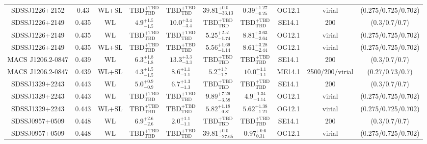 \begin{table}
\begin{tabular}{cccccccccc}
SDSSJ1226+2152 & 0.43 & WL+SL & ${\mathrm{TBD}}^{+\mathrm{TBD}}_{\mathrm{TBD}}$ & ${\mathrm{TBD}}^{+\mathrm{TBD}}_{\mathrm{TBD}}$ & ${39.81}^{+0.0}_{-33.13}$ & ${0.39}^{+1.27}_{-0.25}$ & OG12.1 & virial & (0.275/0.725/0.702) \\
SDSSJ1226+2149 & 0.435 & WL & ${4.9}^{+1.5}_{-1.5}$ & ${10.0}^{+3.4}_{-3.4}$ & ${\mathrm{TBD}}^{+\mathrm{TBD}}_{\mathrm{TBD}}$ & ${\mathrm{TBD}}^{+\mathrm{TBD}}_{\mathrm{TBD}}$ & SE14.1 & 200 & (0.3/0.7/0.7) \\
SDSSJ1226+2149 & 0.435 & WL & ${\mathrm{TBD}}^{+\mathrm{TBD}}_{\mathrm{TBD}}$ & ${\mathrm{TBD}}^{+\mathrm{TBD}}_{\mathrm{TBD}}$ & ${5.25}^{+2.51}_{-1.74}$ & ${8.81}^{+3.63}_{-2.64}$ & OG12.1 & virial & (0.275/0.725/0.702) \\
SDSSJ1226+2149 & 0.435 & WL+SL & ${\mathrm{TBD}}^{+\mathrm{TBD}}_{\mathrm{TBD}}$ & ${\mathrm{TBD}}^{+\mathrm{TBD}}_{\mathrm{TBD}}$ & ${5.56}^{+1.69}_{-1.14}$ & ${8.61}^{+3.28}_{-2.44}$ & OG12.1 & virial & (0.275/0.725/0.702) \\
MACS J1206.2-0847 & 0.439 & WL & ${6.3}^{+1.8}_{-1.8}$ & ${13.3}^{+3.3}_{-3.3}$ & ${\mathrm{TBD}}^{+\mathrm{TBD}}_{\mathrm{TBD}}$ & ${\mathrm{TBD}}^{+\mathrm{TBD}}_{\mathrm{TBD}}$ & SE14.1 & 200 & (0.3/0.7/0.7) \\
MACS J1206.2-0847 & 0.439 & WL+SL & ${4.3}^{+1.5}_{-1.5}$ & ${8.6}^{+1.1}_{-1.1}$ & ${5.2}^{+1.7}_{-1.7}$ & ${10.0}^{+1.1}_{-1.1}$ & ME14.1 & 2500/200/virial & (0.27/0.73/0.7) \\
SDSSJ1329+2243 & 0.443 & WL & ${5.0}^{+0.9}_{-0.9}$ & ${6.7}^{+1.3}_{-1.3}$ & ${\mathrm{TBD}}^{+\mathrm{TBD}}_{\mathrm{TBD}}$ & ${\mathrm{TBD}}^{+\mathrm{TBD}}_{\mathrm{TBD}}$ & SE14.1 & 200 & (0.3/0.7/0.7) \\
SDSSJ1329+2243 & 0.443 & WL & ${\mathrm{TBD}}^{+\mathrm{TBD}}_{\mathrm{TBD}}$ & ${\mathrm{TBD}}^{+\mathrm{TBD}}_{\mathrm{TBD}}$ & ${9.89}^{+7.29}_{-3.58}$ & ${4.9}^{+1.34}_{-1.14}$ & OG12.1 & virial & (0.275/0.725/0.702) \\
SDSSJ1329+2243 & 0.443 & WL+SL & ${\mathrm{TBD}}^{+\mathrm{TBD}}_{\mathrm{TBD}}$ & ${\mathrm{TBD}}^{+\mathrm{TBD}}_{\mathrm{TBD}}$ & ${5.82}^{+1.18}_{-0.81}$ & ${5.62}^{+1.38}_{-1.21}$ & OG12.1 & virial & (0.275/0.725/0.702) \\
SDSSJ0957+0509 & 0.448 & WL & ${6.9}^{+2.6}_{-2.6}$ & ${2.0}^{+1.1}_{-1.1}$ & ${\mathrm{TBD}}^{+\mathrm{TBD}}_{\mathrm{TBD}}$ & ${\mathrm{TBD}}^{+\mathrm{TBD}}_{\mathrm{TBD}}$ & SE14.1 & 200 & (0.3/0.7/0.7) \\
SDSSJ0957+0509 & 0.448 & WL & ${\mathrm{TBD}}^{+\mathrm{TBD}}_{\mathrm{TBD}}$ & ${\mathrm{TBD}}^{+\mathrm{TBD}}_{\mathrm{TBD}}$ & ${39.81}^{+0.0}_{-27.65}$ & ${0.97}^{+0.6}_{0.31}$ & OG12.1 & virial & (0.275/0.725/0.702) \\

\end{tabular}
\end{table}

